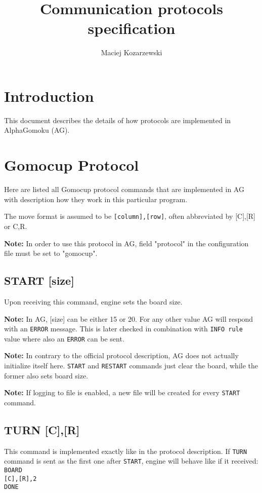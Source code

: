 \documentclass[12pt,a4paper]{article}
\title{Communication protocols specification}
\author{Maciej Kozarzewski}
\date{ }
\begin{document}
\maketitle

\tableofcontents

\section{Introduction}
This document describes the details of how protocols are implemented in AlphaGomoku (AG).


\newpage
\section{Gomocup Protocol}
Here are listed all Gomocup protocol \cite{newprotocol} commands that are implemented in AG with description how they work in this particular program.

The move format is assumed to be \texttt{[column],[row]}, often abbreviated by [C],[R] or C,R.

\textbf{Note:} In order to use this protocol in AG, field "protocol" in the configuration file must be set to "gomocup".

\subsection{START [size]}
\label{cmd_start}
Upon receiving this command, engine sets the board size.

\textbf{Note:} In AG, [size] can be either 15 or 20. For any other value AG will respond with an \texttt{ERROR} message. This is later checked in combination with \texttt{INFO rule} value where also an \texttt{ERROR} can be sent.

\textbf{Note:} In contrary to the official protocol description, AG does not actually initialize itself here. \texttt{START} and \texttt{RESTART} commands just clear the board, while the former also sets board size.

\textbf{Note:} If logging to file is enabled, a new file will be created for every \texttt{START} command.


\subsection{TURN [C],[R]}
\label{cmd_turn}
This command is implemented exactly like in the protocol description. If \texttt{TURN} command is sent as the first one after \texttt{START}, engine will behave like if it received:\\
\texttt{BOARD} \\
\texttt{[C],[R],2} \\
\texttt{DONE}\\
\end{document}
